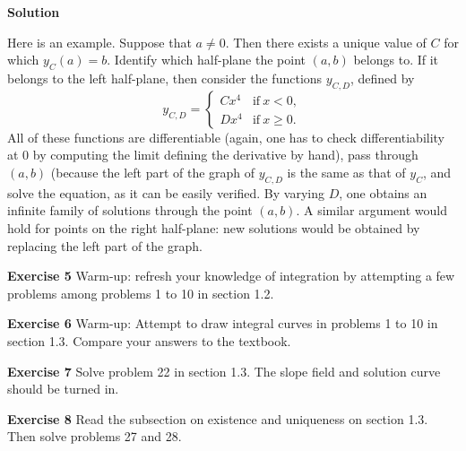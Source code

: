 \documentclass[12pt,oneside]{exam}
\newenvironment{exercise}[1]{\vspace{.1in}\noindent\textbf{Exercise #1 \hspace{.05em}}}{}
\newenvironment{newsolution}{\vspace{.1in}\noindent\textbf{Solution \hspace{.05em}}}{}
\begin{document}
\begin{newsolution}
\begin{itemize}
Here is an example. Suppose that  $a \neq 0$. Then there exists a unique value of $C$ for which $y_C(a)=b$. Identify which half-plane the point $(a,b)$ belongs to. If it belongs to the left half-plane, then consider the functions $y_{C,D}$, defined by 
\begin{equation*}
y_{C,D}=
\left\{
\begin{array}{rl}
Cx^4 & \mbox{if} \ x <0, \\
Dx^4 & \mbox{if} \ x \geq 0. 
\end{array}
\right.
\end{equation*}
All of these functions are differentiable (again, one has to check differentiability at $0$ by computing the limit defining the derivative by hand), pass through $(a,b)$ (because the left part of the graph of $y_{C,D}$ is the same as that of $y_C$, and solve the equation, as it can be easily verified. By varying $D$, one obtains an infinite family of solutions through the point $(a,b)$. A similar argument would hold for points on the right half-plane: new solutions would be obtained by replacing the left part of the graph. 
\end{itemize}
\end{newsolution}

\begin{exercise}{5}
Warm-up: refresh your knowledge of integration by attempting a few problems among problems 1 to 10 in section 1.2. 
\end{exercise}

\begin{exercise}{6} 
Warm-up: Attempt to draw integral curves in problems 1 to 10 in section 1.3. Compare your answers to the textbook. 
\end{exercise}

\begin{exercise}{7}
Solve problem 22 in section 1.3. The slope field and solution curve should be turned in. 
\end{exercise}

\begin{exercise}{8}
Read the subsection on existence and uniqueness on section 1.3. Then solve problems 27 and 28. 
\end{exercise}
\end{document}
